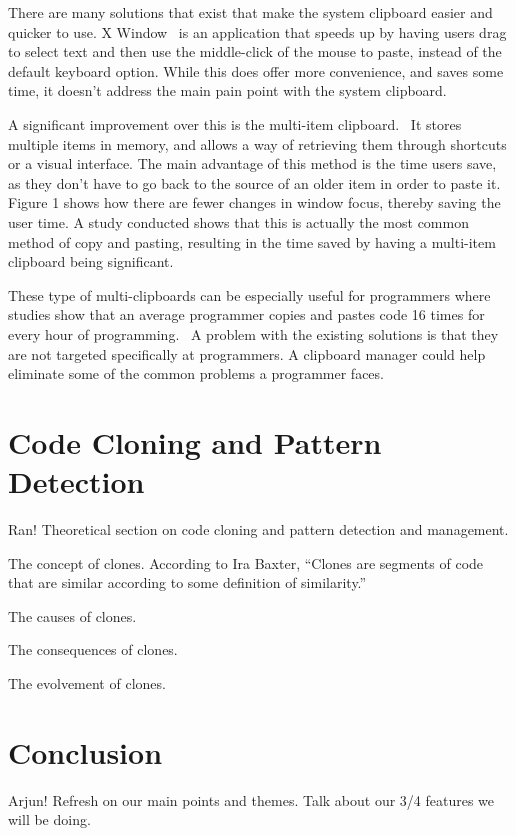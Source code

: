 \documentclass{acm_proc_article-sp}
\begin{document}
There are many solutions that exist that make the system clipboard easier and quicker to use. X Window~\cite{overlapWindow} is an application that speeds up by having users drag to select text and then use the middle-click of the mouse to paste, instead of the default keyboard option. While this does offer more convenience, and saves some time, it doesn't address the main pain point with the system clipboard.

A significant improvement over this is the multi-item clipboard.~\cite{cpHabits} It stores multiple items in memory, and allows a way of retrieving them through shortcuts or a visual interface. The main advantage of this method is the time users save, as they don't have to go back to the source of an older item in order to paste it. Figure 1 shows how there are fewer changes in window focus, thereby saving the user time. A study conducted shows that this is actually the most common method of copy and pasting, resulting in the time saved by having a multi-item clipboard being significant.

These type of multi-clipboards can be especially useful for programmers where studies show that an average programmer copies and pastes code 16 times for every hour of programming.~\cite{ooplCP} A problem with the existing solutions is that they are not targeted specifically at programmers. A clipboard manager could help eliminate some of the common problems a programmer faces. 


\section{Code Cloning and Pattern Detection}
Ran!
Theoretical section on code cloning and pattern detection and management.

The concept of clones.
According to Ira Baxter, “Clones are segments of code that are similar according to some definition of similarity.”

The causes of clones.

The consequences of clones.

The evolvement of clones.





\section{Conclusion}
Arjun!
Refresh on our main points and themes. Talk about our 3/4 features we will be doing.




\end{document}
